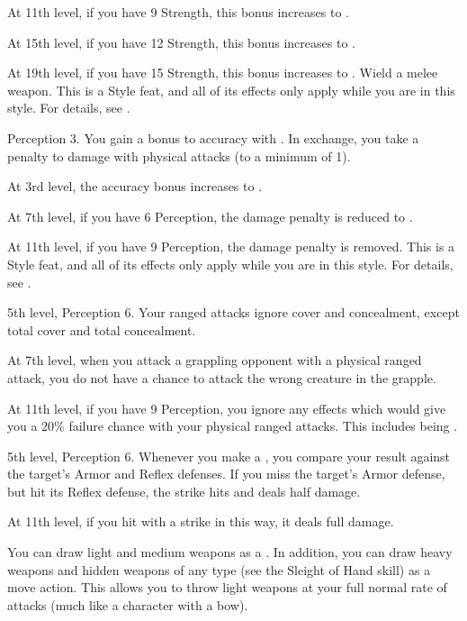     At 11th level, if you have 9 Strength, this bonus increases to .

    At 15th level, if you have 12 Strength, this bonus increases to .

    At 19th level, if you have 15 Strength, this bonus increases to .
    \stylereq Wield a melee weapon.
     This is a Style feat, and all of its effects only apply while you are in this style.
    For details, see .

    \featpres Perception 3.
    \featben You gain a  bonus to accuracy with .
    In exchange, you take a  penalty to damage with physical attacks (to a minimum of 1).

    At 3rd level, the accuracy bonus increases to .

    At 7th level, if you have 6 Perception, the damage penalty is reduced to .

    At 11th level, if you have 9 Perception, the damage penalty is removed.
     This is a Style feat, and all of its effects only apply while you are in this style.
    For details, see .

    \featpres 5th level, Perception 6.
    \featben Your ranged attacks ignore cover and concealment, except total cover and total concealment.

    At 7th level, when you attack a grappling opponent with a physical ranged attack, you do not have a chance to attack the wrong creature in the grapple.

    At 11th level, if you have 9 Perception, you ignore any effects which would give you a 20\% failure chance with your physical ranged attacks.
    This includes being \impaired.

    \featpre 5th level, Perception 6.
    \featben Whenever you make a , you compare your result against the target's Armor and Reflex defenses.
    If you miss the target's Armor defense, but hit its Reflex defense, the strike hits and deals half damage.

    At 11th level, if you hit with a strike in this way, it deals full damage.

    \featben You can draw light and medium weapons as a .
    In addition, you can draw heavy weapons and hidden weapons of any type (see the Sleight of Hand skill) as a move action.
    This allows you to throw light weapons at your full normal rate of attacks (much like a character with a bow).


